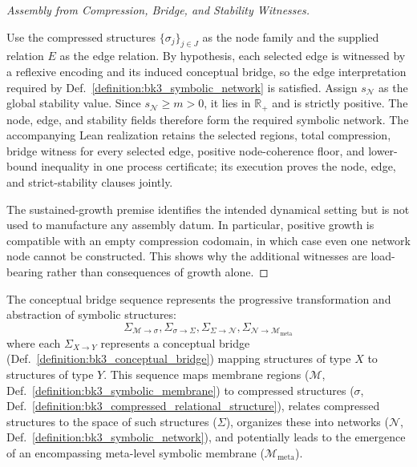 \begin{proof}[Assembly from Compression, Bridge, and Stability Witnesses]
\label{proof:bk3_sketch_symbolic_network_emergence}
\leavevmode

Use the compressed structures $\{\sigma_j\}_{j\in J}$ as the node family and
the supplied relation $E$ as the edge relation.  By hypothesis, each selected
edge is witnessed by a reflexive encoding and its induced conceptual bridge,
so the edge interpretation required by
Def.~\ref{definition:bk3_symbolic_network} is satisfied.  Assign
$s_{\mathcal N}$ as the global stability value.  Since
$s_{\mathcal N}\geq m>0$, it lies in $\mathbb{R}_+$ and is strictly positive.
The node, edge, and stability fields therefore form the required symbolic
network.  The accompanying Lean realization retains the selected regions, total
compression, bridge witness for every selected edge, positive node-coherence
floor, and lower-bound inequality in one process certificate; its execution
proves the node, edge, and strict-stability clauses jointly.

The sustained-growth premise identifies the intended dynamical setting but is
not used to manufacture any assembly datum.  In particular, positive growth is
compatible with an empty compression codomain, in which case even one network
node cannot be constructed.  This shows why the additional witnesses are
load-bearing rather than consequences of growth alone.
\end{proof}

\begin{definition} \label{definition:bk3_conceptual_bridge_sequence}
The conceptual bridge sequence represents the progressive transformation and abstraction of symbolic structures:
\[
\Sigma_{\mathcal{M} \rightarrow \sigma}, \Sigma_{\sigma \rightarrow \Sigma}, \Sigma_{\Sigma \rightarrow \mathcal{N}}, \Sigma_{\mathcal{N} \rightarrow \mathcal{M}_{\text{meta}}}
\]
where each $\Sigma_{X \rightarrow Y}$ represents a conceptual bridge (Def.~\ref{definition:bk3_conceptual_bridge}) mapping structures of type $X$ to structures of type $Y$. This sequence maps membrane regions ($\mathcal{M}$, Def.~\ref{definition:bk3_symbolic_membrane}) to compressed structures ($\sigma$, Def.~\ref{definition:bk3_compressed_relational_structure}), relates compressed structures to the space of such structures ($\Sigma$), organizes these into networks ($\mathcal{N}$, Def.~\ref{definition:bk3_symbolic_network}), and potentially leads to the emergence of an encompassing meta-level symbolic membrane ($\mathcal{M}_{\text{meta}}$).
\end{definition}

